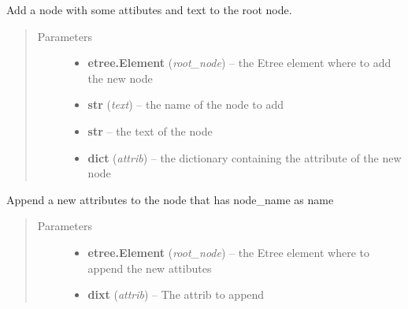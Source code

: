 \documentclass[a4paper,10pt,english]{sphinxmanual}
\begin{document}

\begin{fulllineitems}
\label{commands/apidoc/src:src.xmlManager.add_simple_node}
Add a node with some attibutes and text to the root node.
\begin{quote}\begin{description}
\item[{Parameters}] \leavevmode\begin{itemize}
\item {} 
\textbf{etree.Element} (\emph{root\_node}) -- the Etree element where to add the new node

\item {} 
\textbf{str} (\emph{text}) -- the name of the node to add

\item {} 
\textbf{str} -- the text of the node

\item {} 
\textbf{dict} (\emph{attrib}) -- the dictionary containing the 
attribute of the new node

\end{itemize}

\end{description}\end{quote}

\end{fulllineitems}


\begin{fulllineitems}
\label{commands/apidoc/src:src.xmlManager.append_node_attrib}
Append a new attributes to the node that has node\_name as name
\begin{quote}\begin{description}
\item[{Parameters}] \leavevmode\begin{itemize}
\item {} 
\textbf{etree.Element} (\emph{root\_node}) -- the Etree element 
where to append the new attibutes

\item {} 
\textbf{dixt} (\emph{attrib}) -- The attrib to append

\end{itemize}

\end{description}\end{quote}

\end{fulllineitems}
\end{document}
